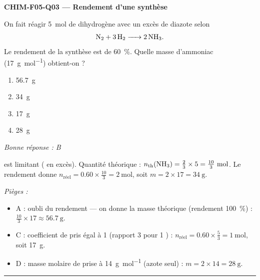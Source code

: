 \documentclass[11pt,a4paper]{article}
\begin{document}
\noindent\textbf{CHIM-F05-Q03 --- Rendement d'une synthèse}\par
On fait réagir \qty{5}{\mole} de dihydrogène avec un excès de diazote selon
\[\ce{N2 + 3 H2 -> 2 NH3}.\]
Le rendement de la synthèse est de \qty{60}{\percent}. Quelle masse d'ammoniac (\qty{17}{\gram\per\mole}) obtient-on ?
\begin{enumerate}[label=\Alph*)]
\item \qty{56.7}{\gram}
\item \qty{34}{\gram}
\item \qty{17}{\gram}
\item \qty{28}{\gram}
\end{enumerate}
\textit{Bonne réponse : B}\par
{} est limitant ( en excès). Quantité théorique : $n_{\text{th}}(\ce{NH3})=\tfrac{2}{3}\times\num{5}=\tfrac{10}{3}~\si{\mole}$. Le rendement donne $n_{\text{réel}}=\num{0.60}\times\tfrac{10}{3}=\num{2}~\si{\mole}$, soit $m=\num{2}\times\num{17}=\qty{34}{\gram}$.\par
\textit{Pièges :}
\begin{itemize}
\item A : oubli du rendement — on donne la masse théorique (rendement \qty{100}{\percent}) : $\tfrac{10}{3}\times\num{17}\approx\qty{56.7}{\gram}$.
\item C : coefficient de  pris égal à \num{1} (rapport \num{3}  pour \num{1} ) : $n_{\text{réel}}=\num{0.60}\times\tfrac{5}{3}=\num{1}~\si{\mole}$, soit \qty{17}{\gram}.
\item D : masse molaire de  prise à \qty{14}{\gram\per\mole} (azote seul) : $m=\num{2}\times\num{14}=\qty{28}{\gram}$.
\end{itemize}
\vspace{6pt}\hrule\vspace{8pt}
\end{document}
